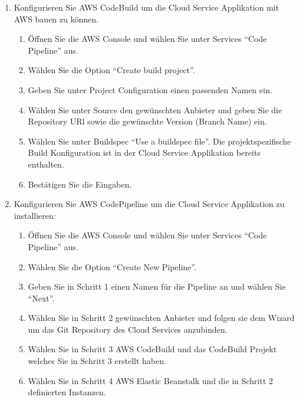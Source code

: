 \begin{enumerate}
\begin{enumerate}
        \item Name: FCM\_CREDENTIALS, Wert: Firebase Credentials mit Base 64 Encoded\footnote{Siehe Installationsanleitung Firebase Messaging}
        \item Name: SPRING\_PROFILES\_ACTIVE, Wert: aws.
        \item Name: ADMIN_ORIGIN, Wert: Admin UI Domain
        \item Name: JWT_SECRET_KEY, Wert: Zufälliger 64 Bit String\footnote{https://www.grc.com/passwords.htm}
    \end{enumerate}
    \item Konfigurieren Sie AWS CodeBuild um die Cloud Service Applikation mit AWS bauen zu können.
    \begin{enumerate}
        \item Öffnen Sie die AWS Console und wählen Sie unter Services ``Code Pipeline'' aus.
        \item Wählen Sie die Option ``Create build project''.
        \item Geben Sie unter Project Configuration einen passenden Namen ein.
        \item Wählen Sie unter Source den gewünschten Anbieter und geben Sie die Repository URl sowie die gewünschte Version (Branch Name) ein.
        \item Wählen Sie unter Buildspec ``Use a buildspec file''. Die projektspezifische Build Konfiguration ist in der Cloud Service Applikation bereits enthalten.
        \item Bestätigen Sie die Eingaben.
    \end{enumerate}
    \item Konfigurieren Sie AWS CodePipeline um die Cloud Service Applikation zu installieren:
    \begin{enumerate}
        \item Öffnen Sie die AWS Console und wählen Sie unter Services ``Code Pipeline'' aus.
        \item Wählen Sie die Option ``Create New Pipeline''.
        \item Geben Sie in Schritt 1 einen Namen für die Pipeline an und wählen Sie ``Next''.
        \item Wählen Sie in Schritt 2 gewünschten Anbieter und folgen sie dem Wizard um das Git Repository des Cloud Services anzubinden.
        \item Wählen Sie in Schritt 3 AWS CodeBuild und das CodeBuild Projekt welches Sie in Schritt 3 erstellt haben.
        \item Wählen Sie in Schritt 4 AWS Elastic Beanstalk und die in Schritt 2 definierten Instanzen.

\end{enumerate}
\end{enumerate}
